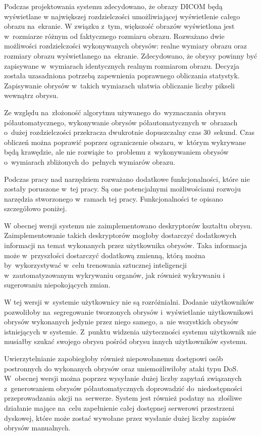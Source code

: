 \documentclass[a4paper,11pt,twoside,openright]{report}
\theoremstyle{definition}
\begin{document}
Podczas projektowania systemu zdecydowano, że obrazy DICOM będą wyświetlane w
największej rozdzielczości umożliwiającej wyświetlenie całego obrazu na~ekranie.
W związku z~tym, większość obrazów wyświetlona jest w~rozmiarze różnym od
faktycznego rozmiaru obrazu. Rozważano dwie możliwości rozdzielczości wykonywanych
obrysów: realne wymiary obrazu oraz rozmiary obrazu wyświetlanego na~ekranie.
Zdecydowano, że obrysy powinny być zapisywane w~wymiarach identycznych realnym
rozmiarom obrazu. Decyzja została uzasadniona potrzebą zapewnienia poprawnego
obliczania statystyk. Zapisywanie obrysów w~takich wymiarach ułatwia obliczanie
liczby pikseli wewnątrz obrysu.

Ze względu na~złożoność algorytmu używanego do~wyznaczania obrysu półautomatycznego,
wykonywanie obrysów półautomatycznych w~obrazach o~dużej rozdzielczości przekracza
dwukrotnie dopuszczalny czas 30~sekund. Czas
obliczeń można poprawić poprzez ograniczenie obszaru, w~którym wykrywane będą
krawędzie, ale nie rozwiąże to~problemu z~wykonywaniem obrysów o~wymiarach
zbliżonych do~pełnych wymiarów obrazu.

Podczas pracy nad narzędziem rozważano dodatkowe funkcjonalności, które nie zostały
poruszone w~tej pracy. Są one potencjalnymi możliwościami rozwoju narzędzia
stworzonego w~ramach tej pracy. Funkcjonalności te opisano szczegółowo poniżej.

W obecnej wersji systemu nie zaimplementowano deskryptorów kształtu obrysu.
Zaimplementowanie takich deskryptorów mogłoby dostarczyć dodatkowych informacji
na temat wykonanych przez użytkownika obrysów. Taka informacja może w~przyszłości
dostarczyć dodatkową zmienną, którą można by~wykorzystywać w~celu trenowania
sztucznej inteligencji w~zautomatyzowanym wykrywaniu organów, jak również wykrywaniu
i sugerowaniu niepokojących zmian.

W tej wersji w~systemie użytkownicy nie są rozróżnialni. Dodanie użytkowników
pozwoliłoby na~segregowanie tworzonych obrysów i~wyświetlanie użytkownikowi
obrysów wykonanych jedynie przez niego samego, a~nie wszystkich obrysów istniejących
w systemie. Z~punktu widzenia użyteczności systemu użytkownik nie musiałby szukać
swojego obrysu pośród obrysu innych użytkowników systemu.

Uwierzytelnianie zapobiegłoby również niepowołanemu dostępowi osób postronnych
do wykonanych obrysów oraz uniemożliwiłoby ataki typu DoS. W~obecnej wersji można
poprzez wysyłanie dużej liczby zapytań związanych z~generowaniem obrysów półautomatycznych
doprowadzić do~niedostępności przeprowadzania akcji na~serwerze. System jest również
podatny na~złośliwe działanie mające na~celu zapełnienie całej dostępnej serwerowi
przestrzeni dyskowej, które może zostać wywołane przez wysłanie dużej liczby
zapisów obrysów manualnych.
\end{document}
